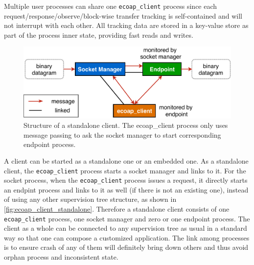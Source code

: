 Multiple user processes can share one \verb|ecoap_client| process since each request/response/observe/block-wise transfer tracking is self-contained and will not interrupt with each other. All tracking data are stored in a key-value store as part of the process inner state, providing fast reads and writes. 

\begin{figure}[!htbp]
\centering
\includegraphics[scale = 0.7]{ecoap_client_standalone}
\caption[Structure of a standalone client]{Structure of a standalone client. The ecoap\_client process only uses message passing to ask the socket manager to start corresponding endpoint process.}
\label{fig:ecoap_client_standalone}
\end{figure}

A client can be started as a standalone one or an embedded one. As a standalone client, the \verb|ecoap_client| process starts a socket manager and links to it. For the socket process, when the \verb|ecoap_client| process issues a request, it directly starts an endpint process and links to it as well (if there is not an existing one), instead of using any other supervision tree structure, as shown in \autoref{fig:ecoap_client_standalone}. Therefore a standalone client consists of one \verb|ecoap_client| process, one socket manager and zero or one endpoint process. The client as a whole can be connected to any supervision tree as usual in a standard way so that one can compose a customized application. The link among processes is to ensure crash of any of them will definitely bring down others and thus avoid orphan process and inconsistent state. 


